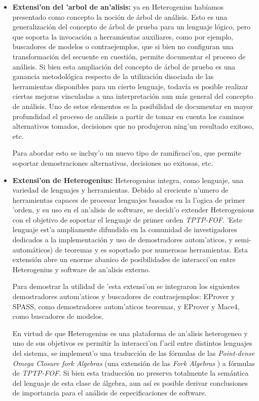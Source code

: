 \begin{itemize}
\item \textbf{Extensi'on del 'arbol de an'alisis:} ya en Heterogenius habíamos presentado como concepto la noción de árbol de análisis. Esto es una generalización del concepto de árbol de prueba para un lenguaje lógico, pero que soporta la invocación a herramientas auxiliares, como por ejemplo, buscadores de modelos o contraejemplos, que si bien no configuran una transformación del secuente en cuestión, permite documentar el proceso de análisis. Si bien esta ampliación del concepto de árbol de prueba es una ganancia metodológica respecto de la utilización disociada de las herramientas disponibles para un cierto lenguaje, todavía es posible realizar ciertas mejoras vinculadas a una interpretación aun más general del concepto de análisis. Uno de estos elementos es la posibilidad de documentar en mayor profundidad el proceso de análisis a partir de tomar en cuenta los caminos alternativos tomados, decisiones que no produjeron ning'un resultado exitoso, etc.

Para abordar esto se incluy'o un nuevo tipo de ramificaci'on, que permite soportar demostraciones alternativas, decisiones no exitosas, etc.

\item \textbf{Extensi'on de Heterogenius:} Heterogenius integra, como lenguaje, una variedad de lenguajes y herramientas. Debido al creciente n'umero de herramientas capaces de procesar lenguajes basados en la l'ogica de primer 'orden, y su uso en el an'alisis de software, se decidi'o extender Heterogenious con el objetivo de soportar el lenguaje de primer orden \textit{TPTP-FOF}. 'Este lenguaje est'a ampliamente difundido en la comunidad de investigadores dedicados a la implementación y uso de demostradores autom'aticos, y semi-automáticos) de teoremas y es soportado por numerosas herramientas. Esta extensión abre un enorme abanico de posibilidades de interacci'on entre Heterogenius y software de an'alisis externo. 

Para demostrar la utilidad de 'esta extensi'on se integraron los siguientes demostradores autom'aticos y buscadores de contraejemplos: EProver y SPASS, como demostradores autom'aticos teoremas, y EProver y Mace4, como buscadores de modelos. 

En virtud de que Heterogenius es una plataforma de an'alisis heterogeneo y uno de sus objetivos es permitir la interacci'on f'acil entre distintos lenguajes del sistema, se implement'o una traducción de las fórmulas de las \emph{Point-dense Omega Closure fork Algebras} \cite{LF06} (una extensión de las \emph{Fork Algebras} \cite{frias02}) a fórmulas de \textit{TPTP-FOF}. Si bien esta traducción no preserva totalmente la semántica del lenguaje de esta clase de álgebra, aun así es posible derivar conclusiones de importancia para el análisis de especificaciones de software.



\end{itemize}
